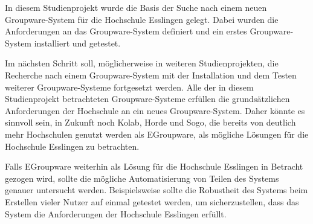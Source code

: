 In diesem Studienprojekt wurde die Basis der Suche nach einem neuen Groupware-System für die Hochschule Esslingen gelegt.
Dabei wurden die Anforderungen an das Groupware-System definiert und ein erstes Groupware-System installiert und getestet.

Im nächsten Schritt soll, möglicherweise in weiteren Studienprojekten, die Recherche nach einem Groupware-System mit der Installation und dem Testen weiterer Groupware-Systeme fortgesetzt werden.
Alle der in diesem Studienprojekt betrachteten Groupware-Systeme erfüllen die grundsätzlichen Anforderungen der Hochschule an ein neues Groupware-System.
Daher könnte es sinnvoll sein, in Zukunft noch Kolab, Horde und Sogo, die bereits von deutlich mehr Hochschulen genutzt werden als EGroupware, als mögliche Lösungen für die Hochschule Esslingen zu betrachten.

Falls EGroupware weiterhin als Lösung für die Hochschule Esslingen in Betracht gezogen wird, sollte die mögliche Automatisierung von Teilen des Systems genauer untersucht werden.
Beispielsweise sollte die Robustheit des Systems beim Erstellen vieler Nutzer auf einmal getestet werden, um sicherzustellen, dass das System die Anforderungen der Hochschule Esslingen erfüllt.


